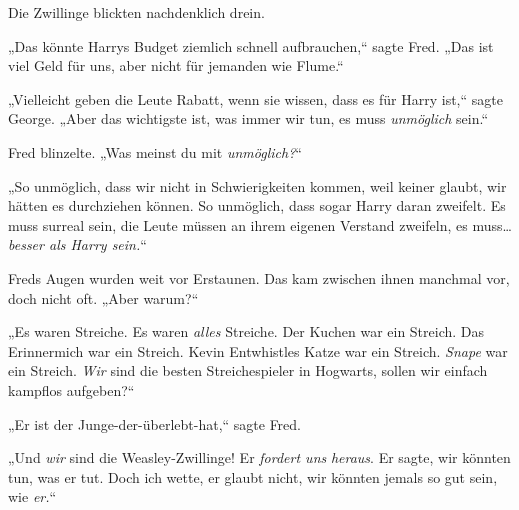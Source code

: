 Die Zwillinge blickten nachdenklich drein.

„Das könnte Harrys Budget ziemlich schnell aufbrauchen,“ sagte Fred. „Das ist viel Geld für uns, aber nicht für jemanden wie Flume.“

„Vielleicht geben die Leute Rabatt, wenn sie wissen, dass es für Harry ist,“ sagte George. „Aber das wichtigste ist, was immer wir tun, es muss \emph{unmöglich} sein.“

Fred blinzelte. „Was meinst du mit \emph{unmöglich?}“

„So unmöglich, dass wir nicht in Schwierigkeiten kommen, weil keiner glaubt, wir hätten es durchziehen können. So unmöglich, dass sogar Harry daran zweifelt. Es muss surreal sein, die Leute müssen an ihrem eigenen Verstand zweifeln, es muss… \emph{besser als Harry sein.}“

Freds Augen wurden weit vor Erstaunen. Das kam zwischen ihnen manchmal vor, doch nicht oft. „Aber warum?“

„Es waren Streiche. Es waren \emph{alles} Streiche. Der Kuchen war ein Streich. Das Erinnermich war ein Streich. Kevin Entwhistles Katze war ein Streich. \emph{Snape} war ein Streich. \emph{Wir} sind die besten Streichespieler in Hogwarts, sollen wir einfach kampflos aufgeben?“

„Er ist der Junge-der-überlebt-hat,“ sagte Fred.

„Und \emph{wir} sind die Weasley-Zwillinge! Er \emph{fordert uns} \emph{heraus}. Er sagte, wir könnten tun, was er tut. Doch ich wette, er glaubt nicht, wir könnten jemals so gut sein, wie \emph{er.}“

